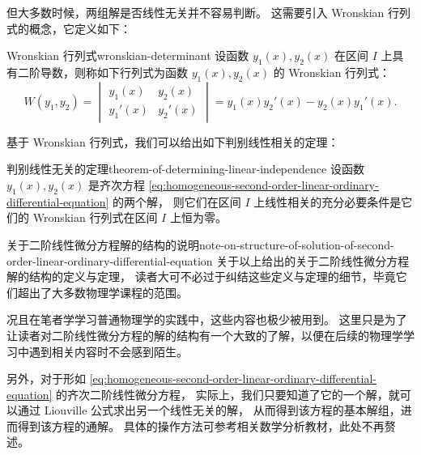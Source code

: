 但大多数时候，两组解是否线性无关并不容易判断。
这需要引入 Wronskian 行列式的概念，它定义如下：
\begin{definition}{Wronskian 行列式}{wronskian-determinant}
    设函数 $ y_1 (x) , y_2 (x) $ 在区间 $ I $ 上具有二阶导数，则称如下行列式为函数 $ y_1 (x) , y_2 (x) $ 的 Wronskian 行列式：
    \begin{equation*}
        W(y_1 , y_2) = \begin{vmatrix}
            y_1 (x)  & y_2 (x)  \\
            y_1' (x) & y_2' (x)
        \end{vmatrix} = y_1 (x) y_2' (x) - y_2 (x) y_1' (x) .
    \end{equation*}
\end{definition}

基于 Wronskian 行列式，我们可以给出如下判别线性相关的定理：
\begin{theorem}{判别线性无关的定理}{theorem-of-determining-linear-independence}
    设函数 $ y_1 (x) , y_2 (x) $ 是齐次方程 \cref{eq:homogeneous-second-order-linear-ordinary-differential-equation} 的两个解，
    则它们在区间 $ I $ 上线性相关的充分必要条件是它们的 Wronskian 行列式在区间 $ I $ 上恒为零。
\end{theorem}

\begin{note}{关于二阶线性微分方程解的结构的说明}{note-on-structure-of-solution-of-second-order-linear-ordinary-differential-equation}
    关于以上给出的关于二阶线性微分方程解的结构的定义与定理，
    读者大可不必过于纠结这些定义与定理的细节，毕竟它们超出了大多数物理学课程的范围。

    况且在笔者学学习普通物理学的实践中，这些内容也极少被用到。
    这里只是为了让读者对二阶线性微分方程的解的结构有一个大致的了解，以便在后续的物理学学习中遇到相关内容时不会感到陌生。

    另外，对于形如 \cref{eq:homogeneous-second-order-linear-ordinary-differential-equation} 的齐次二阶线性微分方程，
    实际上，我们只要知道了它的一个解，就可以通过 Liouville 公式求出另一个线性无关的解，
    从而得到该方程的基本解组，进而得到该方程的通解。
    具体的操作方法可参考相关数学分析教材，此处不再赘述。
\end{note}

\bigskip

